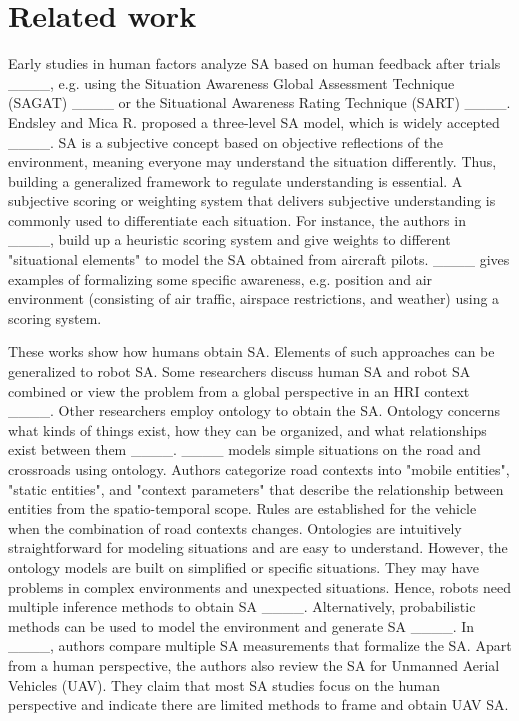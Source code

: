 \section{Related work}
Early studies in human factors analyze SA based on human feedback after trials ____, e.g. using the Situation Awareness Global Assessment Technique (SAGAT) ____ or the Situational Awareness Rating Technique (SART) ____. Endsley and Mica R. proposed a three-level SA model, which is widely accepted ____. SA is a subjective concept based on objective reflections of the environment, meaning everyone may understand the situation differently. Thus, building a generalized framework to regulate understanding is essential. A subjective scoring or weighting system that delivers subjective understanding is commonly used to differentiate each situation. For instance, the authors in ____, build up a heuristic scoring system and give weights to different "situational elements" to model the SA obtained from aircraft pilots. ____ gives examples of formalizing some specific awareness, e.g. position and air environment (consisting of air traffic, airspace restrictions, and weather) using a scoring system. 

These works show how humans obtain SA. Elements of such approaches can be generalized to robot SA. Some researchers discuss human SA and robot SA combined or view the problem from a global perspective in an HRI context ____. 
Other researchers employ ontology to obtain the SA. Ontology concerns what kinds of things exist, how they can be organized, and what relationships exist between them ____. ____ models simple situations on the road and crossroads using ontology. Authors categorize road contexts into "mobile entities", "static entities", and "context parameters" that describe the relationship between entities from the spatio-temporal scope. Rules are established for the vehicle when the combination of road contexts changes. Ontologies are intuitively straightforward for modeling situations and are easy to understand. However, the ontology models are built on simplified or specific situations. They may have problems in complex environments and unexpected situations. Hence, robots need multiple inference methods to obtain SA ____. Alternatively, probabilistic methods can be used to model the environment and generate SA ____. In ____, authors compare multiple SA measurements that formalize the SA. Apart from a human perspective, the authors also review the SA for Unmanned Aerial Vehicles (UAV). They claim that most SA studies focus on the human perspective and indicate there are limited methods to frame and obtain UAV SA. 


